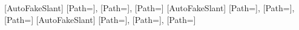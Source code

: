 
\setCJKfallbackfamilyfont{\CJKrmdefault}[AutoFakeSlant]{
    [Path=\myfontdir]{\mycjkfallbackfontA},
    [Path=\myfontdir]{\mycjkfallbackfontB},
    [Path=\myfontdir]{\mycjkfallbackfontE}
}
\setCJKfallbackfamilyfont{\CJKsfdefault}[AutoFakeSlant]{
    [Path=\myfontdir]{\mycjkfallbackfontA},
    [Path=\myfontdir]{\mycjkfallbackfontB},
    [Path=\myfontdir]{\mycjkfallbackfontE}
}
\setCJKfallbackfamilyfont{\CJKttdefault}[AutoFakeSlant]{
    [Path=\myfontdir]{\mycjkfallbackfontA},
    [Path=\myfontdir]{\mycjkfallbackfontB},
    [Path=\myfontdir]{\mycjkfallbackfontE}
}

